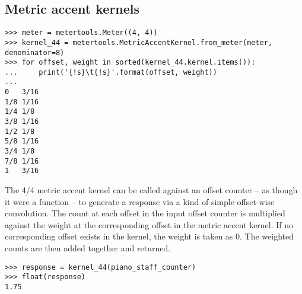 \subsection{Metric accent kernels}

\begin{comment}
<abjad>
meter = metertools.Meter((4, 4))
kernel_44 = metertools.MetricAccentKernel.from_meter(meter, denominator=8)
for offset, weight in sorted(kernel_44.kernel.items()):
    print('{!s}\t{!s}'.format(offset, weight))

</abjad>
\end{comment}

\begin{singlespacing}
\vspace{-0.5\baselineskip}
\begin{lstlisting}
>>> meter = metertools.Meter((4, 4))
>>> kernel_44 = metertools.MetricAccentKernel.from_meter(meter, denominator=8)
>>> for offset, weight in sorted(kernel_44.kernel.items()):
...     print('{!s}\t{!s}'.format(offset, weight))
...
0	3/16
1/8	1/16
1/4	1/8
3/8	1/16
1/2	1/8
5/8	1/16
3/4	1/8
7/8	1/16
1	3/16
\end{lstlisting}
\end{singlespacing}

\noindent The 4/4 metric accent kernel can be called against an offset counter
-- as though it were a function -- to generate a response via a kind of simple
offset-wise convolution. The count at each offset in the input offset counter
is multiplied against the weight at the corresponding offset in the metric
accent kernel. If no corresponding offset exists in the kernel, the weight is
taken as 0. The weighted counts are then added together and returned.

\begin{comment}
<abjad>
response = kernel_44(piano_staff_counter)
float(response)
</abjad>
\end{comment}

\begin{singlespacing}
\vspace{-0.5\baselineskip}
\begin{lstlisting}
>>> response = kernel_44(piano_staff_counter)
>>> float(response)
1.75
\end{lstlisting}
\end{singlespacing}

\begin{comment}
<abjad>
total = Multiplier(0, 1)
for offset, count in sorted(piano_staff_counter.items()):
    weight = Multiplier(0, 1)
    if offset in kernel_44.kernel:
        weight = kernel_44.kernel[offset]
    weighted_count = weight * count
    total += weighted_count
    print(offset, count, weight, weighted_count, total)

</abjad>
\end{comment}

